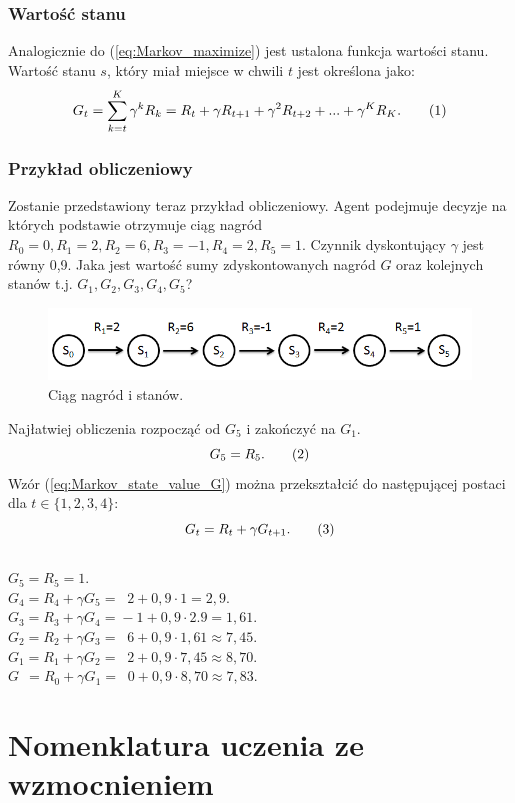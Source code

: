 \documentclass[12pt]{book}
\theoremstyle{plain}
\newcommand\addtag{\refstepcounter{equation}
\renewcommand{\labelenumii}{\theenumii}
\renewcommand{\theenumii}{\theenumi.\arabic{enumii}.}
\tag{\theequation}}
\newcommand{\myref}[1]{(\ref{#1})}
\begin{document}
\subsubsection*{Wartość stanu}
Analogicznie do (\ref{eq:Markov_maximize}) jest ustalona funkcja wartości stanu. Wartość stanu $s$, który miał miejsce w chwili $t$ jest określona jako:
\[
G_t=\sum_{k=t}^{K} \gamma^k R_{k}=R_{t}+\gamma R_{t+1}+\gamma^{2} R_{t+2}+...+\gamma^{K}R_K. \addtag \label{eq:Markov_state_value_G}
\]
\subsubsection*{Przykład obliczeniowy}
Zostanie przedstawiony teraz przykład obliczeniowy. Agent podejmuje decyzje na których podstawie otrzymuje ciąg  nagród $R_0=0, R_1=2,R_2=6,R_3=-1,R_4=2,R_5=1$. Czynnik dyskontujący $\gamma$ jest równy 0,9. Jaka jest wartość sumy zdyskontowanych nagród $G$ oraz kolejnych stanów t.j. $G_1,G_2,G_3,G_4,G_5$?\\
\begin{figure}[H]
	\centering
	\includegraphics[width=14cm]{rewards-graph}
	\caption{Ciąg nagród i stanów.}
	\label{fig:agent-srodowisko}
\end{figure}\noindent
Najłatwiej obliczenia rozpocząć od $G_5$ i zakończyć na $G_1$.
\[G_5=R_5.  \addtag\]
Wzór \myref{eq:Markov_state_value_G} można przekształcić do następującej postaci dla $t \in \{1,2,3,4\}$:
\[G_{t}=R_{t}+\gamma G_{t+1} \label{eq:G_reccurential}. \addtag \]\\
$G_5=R_5=1.$\\
$G_4=R_4+\gamma G_{5}=\;\;2+0,9\cdot 1=2,9.$\\
$G_3=R_3+\gamma G_{4}=\!-1+0,9\cdot2.9=1,61.$\\
$G_2=R_2+\gamma G_{3}=\;\;6+0,9\cdot1,61 \approx 7,45.$\\
$G_1=R_1+\gamma G_{2}=\;\;2+0,9\cdot 7,45 \approx 8,70.$\\
$G\;\,=R_0+\gamma G_{1}=\;\;0+0,9\cdot 8,70 \approx 7,83.$\\

\section{Nomenklatura uczenia ze wzmocnieniem}
\end{document}
